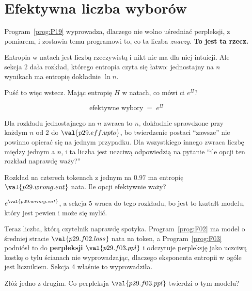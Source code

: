 \section{Efektywna liczba wyborów}
\label{sec:P29-effective}

\begin{fr}
Program~\ref{prog:P19} wyprowadza, dlaczego nie wolno uśredniać perpleksji, z
pomiarem, i zostawia temu programowi to, co ta liczba \emph{znaczy}.
\textbf{To jest ta rzecz.}

Entropia w natach jest liczbą rzeczywistą i nikt nie ma dla niej intuicji. Ale
sekcja 2 dała rozkład, którego entropia czyta się łatwo: jednostajny na $n$
wynikach ma entropię dokładnie $\ln n$.

Puść to więc wstecz. Mając entropię $H$ w natach, co mówi ci $e^{H}$?
\dotline
\nextframe
\end{fr}

\begin{fr}

\[ \text{efektywne wybory} \;=\; e^{H} \]

Dla rozkładu jednostajnego na $n$ zwraca to $n$, dokładnie \dash{} sprawdzone
przy każdym $n$ od $2$ do $\val{p29.eff.upto}$, bo twierdzenie postaci
\enquote{zawsze} nie powinno opierać się na jednym przypadku. Dla wszystkiego
innego zwraca liczbę między jednym a $n$, i ta liczba jest uczciwą odpowiedzią
na pytanie \enquote{ile opcji ten rozkład naprawdę waży?}


Rozkład na czterech tokenach z jednym na $\num{0.97}$ ma entropię
$\val{p29.wrong.ent}$ nata. Ile opcji efektywnie waży?
\dotline
\nextframe
\end{fr}

\begin{fr}

$e^{\val{p29.wrong.ent}}$, a sekcja 5 wraca do tego rozkładu, bo jest to
kształt modelu, który jest pewien i może się mylić.

Teraz liczba, którą czytelnik naprawdę spotyka. Program~\ref{prog:F02} ma
model o średniej stracie $\val{p29.f02.loss}$ nata na token, a
Program~\ref{prog:F03} podniósł to do \textbf{perpleksji}
$\val{p29.f03.ppl}$ i odczytuje perpleksję jako uczciwą kostkę o tylu
ścianach \dash{} nie wyprowadzając, dlaczego eksponenta entropii w ogóle jest
licznikiem. Sekcja 4 właśnie to wyprowadziła.

Złóż jedno z drugim. Co perpleksja $\val{p29.f03.ppl}$ twierdzi o tym modelu?
\dotline
\nextframe
\end{fr}

